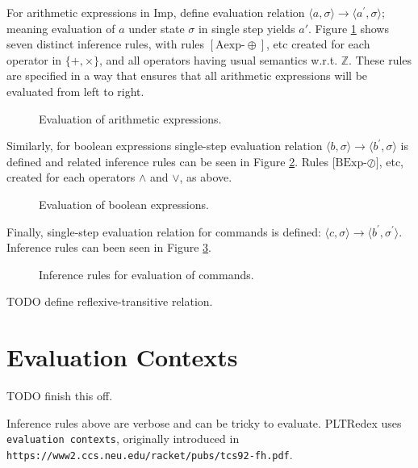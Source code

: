 For arithmetic expressions in Imp, define evaluation relation $\langle a, \sigma \rangle \rightarrow \langle a^\prime, \sigma  \rangle$; meaning evaluation of $a$ under state $\sigma$ in single step yields $a\prime$. Figure \ref{infer-arith} shows seven distinct inference rules, with rules $[\text{Aexp-}\oplus]$, etc created for each operator in $\{+, \times \}$, and all operators having usual semantics w.r.t. $\mathbb{Z}$. These rules are specified in a way that ensures that all arithmetic expressions will be evaluated from left to right.

\begin{figure}[h]

\caption{Evaluation of arithmetic expressions.}
\label{infer-arith}
\end{figure}

Similarly, for boolean expressions single-step evaluation relation $\langle b, \sigma \rangle \rightarrow \langle b^\prime, \sigma  \rangle$ is defined and related inference rules can be seen in Figure \ref{infer-bool}. Rules [$\text{BExp-}\oslash]$, etc, created for each operators $\land$ and $\lor$, as above.

\begin{figure}[h]

\caption{Evaluation of boolean expressions.}
\label{infer-bool}
\end{figure}

Finally, single-step evaluation relation for commands is defined: $\langle c, \sigma \rangle \rightarrow \langle b^\prime, \sigma^\prime \rangle$. Inference rules can been seen in Figure \ref{infer-comm}.

\begin{figure}[h]

\caption{Inference rules for evaluation of commands.}
\label{infer-comm}
\end{figure}

TODO define reflexive-transitive relation.



\section{Evaluation Contexts}
\label{02-evaluation-context}
TODO finish this off.

Inference rules above are verbose and can be tricky to evaluate. PLTRedex uses \texttt{evaluation contexts}, originally introduced in \texttt{https://www2.ccs.neu.edu/racket/pubs/tcs92-fh.pdf}. 

